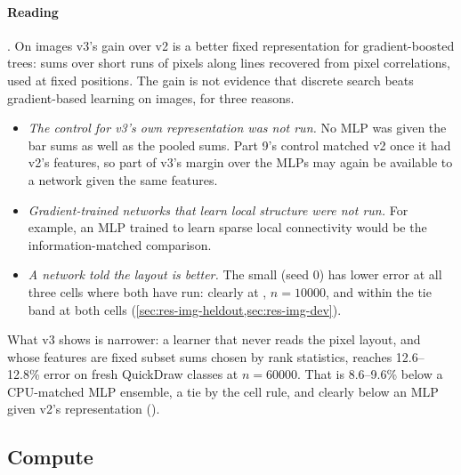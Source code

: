 \paragraph{Reading} . On images v3's gain over v2 is a better fixed representation for gradient-boosted trees: sums over short runs of pixels along lines recovered from pixel correlations, used at fixed positions. The gain is not evidence that discrete search beats gradient-based learning on images, for three reasons.
\begin{itemize}
\item \emph{The control for v3's own representation was not run.} No MLP was given the bar sums as well as the pooled sums. Part 9's control matched v2 once it had v2's features, so part of v3's margin over the MLPs may again be available to a network given the same features.
\item \emph{Gradient-trained networks that learn local structure were not run.} For example, an MLP trained to learn sparse local connectivity \cite{neyshabur2020convolutions} would be the information-matched comparison.
\item \emph{A network told the layout is better.} The small  (seed 0) has lower error at all three cells where both have run: clearly at , $n=10000$, and within the tie band at both  cells (\cref{sec:res-img-heldout,sec:res-img-dev}).
\end{itemize}
What v3 shows is narrower: a learner that never reads the pixel layout, and whose features are fixed subset sums chosen by rank statistics, reaches 12.6--12.8\% error on fresh QuickDraw classes at $n=60000$. That is 8.6--9.6\% below a CPU-matched MLP ensemble, a tie by the cell rule, and clearly below an MLP given v2's representation ().

\subsection{Compute}\label{sec:res-img-compute}

\begin{table}[tbp]
\centering{\footnotesize\setlength{\tabcolsep}{2.4pt}
}
\caption{Compute per fit on the held-out image cells . Budget: three training runs of the baseline MLP (), $1.24$, $2.42$ and $6.21\times10^{12}$ FLOPs at $n=1000$, 10000 and 60000. FLOPs / budget: each learner's own count, everything in the fit included and prediction excluded. CPU s: process CPU seconds per fit, and the seconds v3 attributes to . A range is over the 3 seeds; $n=60000$ has one fit. The MLP references record wall-clock seconds per fit on the shared 4-core machine, not process CPU time (the \texttt{cpu\_seconds} field of their result files), with their FLOPs per fit in units of the budget in brackets. Sources: the result files and \texttt{.info.json} records in .}
\label{tab:img-compute}
\end{table}

